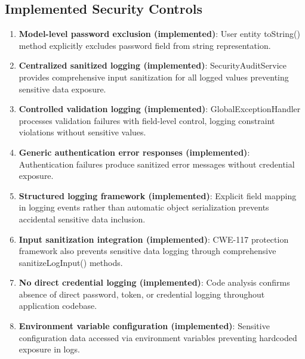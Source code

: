 \documentclass[]{UCD_CS_FYP_Report}
\begin{document}
\subsection{Implemented Security Controls}
\begin{enumerate}
	\item \textbf{Model-level password exclusion (implemented)}: User entity toString() method explicitly excludes password field from string representation.
	\item \textbf{Centralized sanitized logging (implemented)}: SecurityAuditService provides comprehensive input sanitization for all logged values preventing sensitive data exposure.
	\item \textbf{Controlled validation logging (implemented)}: GlobalExceptionHandler processes validation failures with field-level control, logging constraint violations without sensitive values.
	\item \textbf{Generic authentication error responses (implemented)}: Authentication failures produce sanitized error messages without credential exposure.
	\item \textbf{Structured logging framework (implemented)}: Explicit field mapping in logging events rather than automatic object serialization prevents accidental sensitive data inclusion.
	\item \textbf{Input sanitization integration (implemented)}: CWE-117 protection framework also prevents sensitive data logging through comprehensive sanitizeLogInput() methods.
	\item \textbf{No direct credential logging (implemented)}: Code analysis confirms absence of direct password, token, or credential logging throughout application codebase.
	\item \textbf{Environment variable configuration (implemented)}: Sensitive configuration data accessed via environment variables preventing hardcoded exposure in logs.
\end{enumerate}
\end{document}
